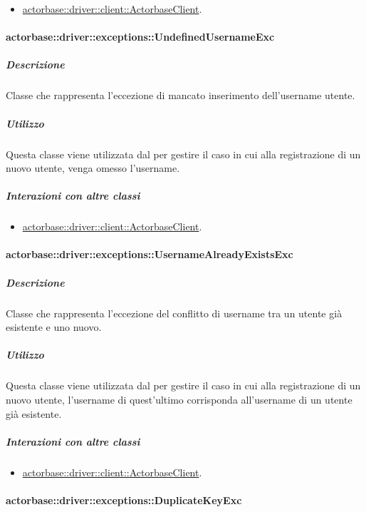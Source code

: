 \documentclass{scalatekids-article}
\begin{document}
\begin{itemize}
\item \hyperref[sec:actorbase::driver::client::ActorbaseClient]{actorbase::driver::client::ActorbaseClient}.
\end{itemize}

\paragraph{actorbase::driver::exceptions::UndefinedUsernameExc}

\subparagraph{Descrizione}

Classe che rappresenta l'eccezione di mancato inserimento dell'username utente.

\subparagraph{Utilizzo}

Questa classe viene utilizzata dal  per gestire il caso in cui alla registrazione di un nuovo utente, venga omesso l'username.

\subparagraph{Interazioni con altre classi}

\begin{itemize}
\item \hyperref[sec:actorbase::driver::client::ActorbaseClient]{actorbase::driver::client::ActorbaseClient}.
\end{itemize}

\paragraph{actorbase::driver::exceptions::UsernameAlreadyExistsExc}

\subparagraph{Descrizione}

Classe che rappresenta l'eccezione del conflitto di username tra un utente già esistente e uno nuovo.

\subparagraph{Utilizzo}

Questa classe viene utilizzata dal  per gestire il caso in cui alla registrazione di un nuovo utente, l'username di quest'ultimo corrisponda all'username di un utente già esistente.

\subparagraph{Interazioni con altre classi}

\begin{itemize}
\item \hyperref[sec:actorbase::driver::client::ActorbaseClient]{actorbase::driver::client::ActorbaseClient}.
\end{itemize}

\paragraph{actorbase::driver::exceptions::DuplicateKeyExc}
\end{document}
